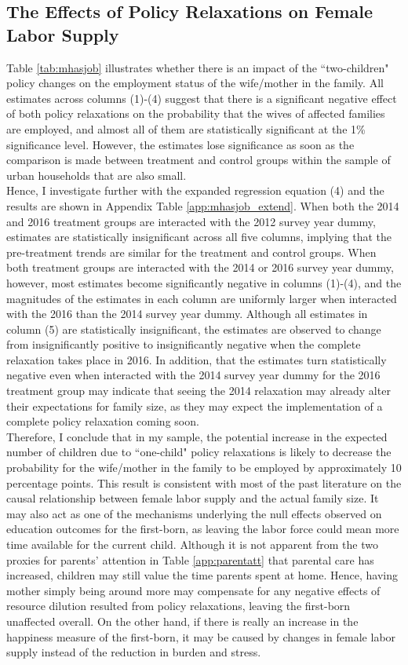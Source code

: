\documentclass[12pt]{extarticle}
\begin{document}
\subsection{The Effects of Policy Relaxations on Female Labor Supply}
Table \ref{tab:mhasjob} illustrates whether there is an impact of the ``two-children" policy changes on the employment status of the wife/mother in the family. All estimates across columns (1)-(4) suggest that there is a significant negative effect of both policy relaxations on the probability that the wives of affected families are employed, and almost all of them are statistically significant at the 1\% significance level. However, the estimates lose significance as soon as the comparison is made between treatment and control groups within the sample of urban households that are also small. \\
\indent Hence, I investigate further with the expanded regression equation (4) and the results are shown in Appendix Table \ref{app:mhasjob_extend}. When both the 2014 and 2016 treatment groups are interacted with the 2012 survey year dummy, estimates are statistically insignificant across all five columns, implying that the pre-treatment trends are similar for the treatment and control groups. When both treatment groups are interacted with the 2014 or 2016 survey year dummy, however, most estimates become significantly negative in columns (1)-(4), and the magnitudes of the estimates in each column are uniformly larger when interacted with the 2016 than the 2014 survey year dummy. Although all estimates in column (5) are statistically insignificant, the estimates are observed to change from insignificantly positive to insignificantly negative when the complete relaxation takes place in 2016. In addition, that the estimates turn statistically negative even when interacted with the 2014 survey year dummy for the 2016 treatment group may indicate that seeing the 2014 relaxation may already alter their expectations for family size, as they may expect the implementation of a complete policy relaxation coming soon. \\
\indent Therefore, I conclude that in my sample, the potential increase in the expected number of children due to ``one-child" policy relaxations is likely to decrease the probability for the wife/mother in the family to be employed by approximately 10 percentage points. This result is consistent with most of the past literature on the causal relationship between female labor supply and the actual family size. It may also act as one of the mechanisms underlying the null effects observed on education outcomes for the first-born, as leaving the labor force could mean more time available for the current child. Although it is not apparent from the two proxies for parents' attention in Table \ref{app:parentatt} that parental care has increased, children may still value the time parents spent at home. Hence, having mother simply being around more may compensate for any negative effects of resource dilution resulted from policy relaxations, leaving the first-born unaffected overall. On the other hand, if there is really an increase in the happiness measure of the first-born, it may be caused by changes in female labor supply instead of the reduction in burden and stress.
\end{document}

